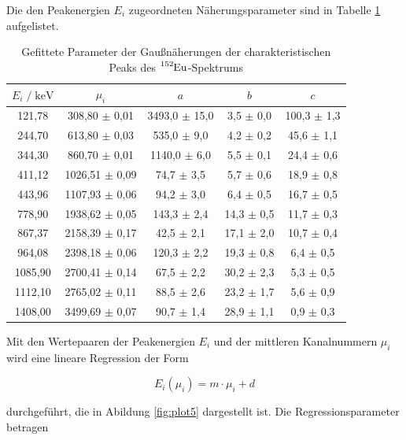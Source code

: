 Die den Peakenergien $E_i$ zugeordneten Näherungsparameter sind in Tabelle \ref{tab:mess1} aufgelistet.

\begin{table}
  \centering
  \caption{Gefittete Parameter der Gaußnäherungen der charakteristischen Peaks des $\ce{^{152}Eu}$-Spektrums}
  \label{tab:mess1}
  \begin{tabular}{c c c c c}
  \toprule
  $ E_i \;/\; \si{\kilo\eV}$ & $\mu_i$ & $a$ & $b$ & $c$ \\
  \midrule
        121,78 &  308,80 $\pm$ 0,01 & 3493,0 $\pm$ 15,0 &  3,5 $\pm$ 0,0 & 100,3 $\pm$ 1,3 \\
        244,70 &  613,80 $\pm$ 0,03 &  535,0 $\pm$  9,0 &  4,2 $\pm$ 0,2 &  45,6 $\pm$ 1,1 \\
        344,30 &  860,70 $\pm$ 0,01 & 1140,0 $\pm$  6,0 &  5,5 $\pm$ 0,1 &  24,4 $\pm$ 0,6 \\
        411,12 & 1026,51 $\pm$ 0,09 &   74,7 $\pm$  3,5 &  5,7 $\pm$ 0,6 &  18,9 $\pm$ 0,8 \\
        443,96 & 1107,93 $\pm$ 0,06 &   94,2 $\pm$  3,0 &  6,4 $\pm$ 0,5 &  16,7 $\pm$ 0,5 \\
        778,90 & 1938,62 $\pm$ 0,05 &  143,3 $\pm$  2,4 & 14,3 $\pm$ 0,5 &  11,7 $\pm$ 0,3 \\
        867,37 & 2158,39 $\pm$ 0,17 &   42,5 $\pm$  2,1 & 17,1 $\pm$ 2,0 &  10,7 $\pm$ 0,4 \\
        964,08 & 2398,18 $\pm$ 0,06 &  120,3 $\pm$  2,2 & 19,3 $\pm$ 0,8 &   6,4 $\pm$ 0,5 \\
       1085,90 & 2700,41 $\pm$ 0,14 &   67,5 $\pm$  2,2 & 30,2 $\pm$ 2,3 &   5,3 $\pm$ 0,5 \\
       1112,10 & 2765,02 $\pm$ 0,11 &   88,5 $\pm$  2,6 & 23,2 $\pm$ 1,7 &   5,6 $\pm$ 0,9 \\
       1408,00 & 3499,69 $\pm$ 0,07 &   90,7 $\pm$  1,4 & 28,9 $\pm$ 1,1 &   0,9 $\pm$ 0,3 \\
  \bottomrule
  \end{tabular}
  \end{table}

Mit den Wertepaaren der Peakenergien $E_i$ und der mittleren Kanalnummern $\mu_i$ wird eine lineare Regression der Form

\begin{equation}
  E_i(\mu_i) = m \cdot \mu_i + d
\end{equation}
  
durchgeführt, die in Abildung \ref{fig:plot5} dargestellt ist.
Die Regressionsparameter betragen

